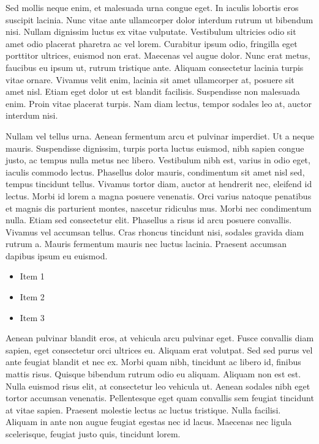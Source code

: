 \documentclass[a4paper,fleqn]{cas-dc}
\begin{document}
Sed mollis neque enim, et malesuada urna congue eget. In iaculis lobortis eros suscipit lacinia. Nunc vitae ante ullamcorper dolor interdum rutrum ut bibendum nisi. Nullam dignissim luctus ex vitae vulputate. Vestibulum ultricies odio sit amet odio placerat pharetra ac vel lorem. Curabitur ipsum odio, fringilla eget porttitor ultrices, euismod non erat. Maecenas vel augue dolor. Nunc erat metus, faucibus eu ipsum ut, rutrum tristique ante. Aliquam consectetur lacinia turpis vitae ornare. Vivamus velit enim, lacinia sit amet ullamcorper at, posuere sit amet nisl. Etiam eget dolor ut est blandit facilisis. Suspendisse non malesuada enim. Proin vitae placerat turpis. Nam diam lectus, tempor sodales leo at, auctor interdum nisi.

Nullam vel tellus urna. Aenean fermentum arcu et pulvinar imperdiet. Ut a neque mauris. Suspendisse dignissim, turpis porta luctus euismod, nibh sapien congue justo, ac tempus nulla metus nec libero. Vestibulum nibh est, varius in odio eget, iaculis commodo lectus. Phasellus dolor mauris, condimentum sit amet nisl sed, tempus tincidunt tellus. Vivamus tortor diam, auctor at hendrerit nec, eleifend id lectus. Morbi id lorem a magna posuere venenatis. Orci varius natoque penatibus et magnis dis parturient montes, nascetur ridiculus mus. Morbi nec condimentum nulla. Etiam sed consectetur elit. Phasellus a risus id arcu posuere convallis. Vivamus vel accumsan tellus. Cras rhoncus tincidunt nisi, sodales gravida diam rutrum a. Mauris fermentum mauris nec luctus lacinia. Praesent accumsan dapibus ipsum eu euismod\citep{candiago2015VegIndices}.

\begin{itemize}
    \item Item 1
    \item Item 2
    \item Item 3
\end{itemize}

Aenean pulvinar blandit eros, at vehicula arcu pulvinar eget. Fusce convallis diam sapien, eget consectetur orci ultrices eu. Aliquam erat volutpat. Sed sed purus vel ante feugiat blandit et nec ex. Morbi quam nibh, tincidunt ac libero id, finibus mattis risus. Quisque bibendum rutrum odio eu aliquam. Aliquam non est est. Nulla euismod risus elit, at consectetur leo vehicula ut. Aenean sodales nibh eget tortor accumsan venenatis. Pellentesque eget quam convallis sem feugiat tincidunt at vitae sapien. Praesent molestie lectus ac luctus tristique. Nulla facilisi. Aliquam in ante non augue feugiat egestas nec id lacus. Maecenas nec ligula scelerisque, feugiat justo quis, tincidunt lorem.
\end{document}
